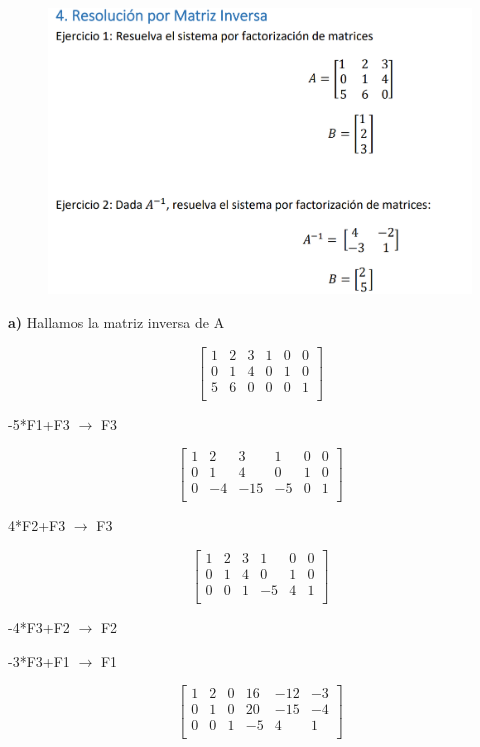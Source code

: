 \documentclass[12pt]{article}
\begin{document}
\begin{figure}[H]
\includegraphics[width=1\textwidth]{./inFiles/Figures/Ej4.png}
\end{figure}


\textbf{a)}
Hallamos la matriz inversa de A

\[
\begin{bmatrix}
1 & 2 & 3 & 1& 0& 0\\
0 & 1 & 4 & 0& 1& 0\\
5 & 6 & 0 & 0& 0& 1\\
\end{bmatrix}
\]

-5*F1+F3 $\longrightarrow $ F3

\[
\begin{bmatrix}
1 & 2 & 3 & 1& 0& 0\\
0 & 1 & 4 & 0& 1& 0\\
0 & -4 & -15 & -5& 0& 1\\
\end{bmatrix}
\]

4*F2+F3 $\longrightarrow $ F3

\[
\begin{bmatrix}
1 & 2 & 3 & 1& 0& 0\\
0 & 1 & 4 & 0& 1& 0\\
0 & 0& 1 & -5& 4& 1\\
\end{bmatrix}
\]

-4*F3+F2 $\longrightarrow $ F2

-3*F3+F1 $\longrightarrow $ F1


\[
\begin{bmatrix}
1 & 2 & 0 & 16& -12& -3\\
0 & 1 & 0 & 20& -15& -4\\
0 & 0& 1 & -5& 4& 1\\
\end{bmatrix}
\]
\end{document}
